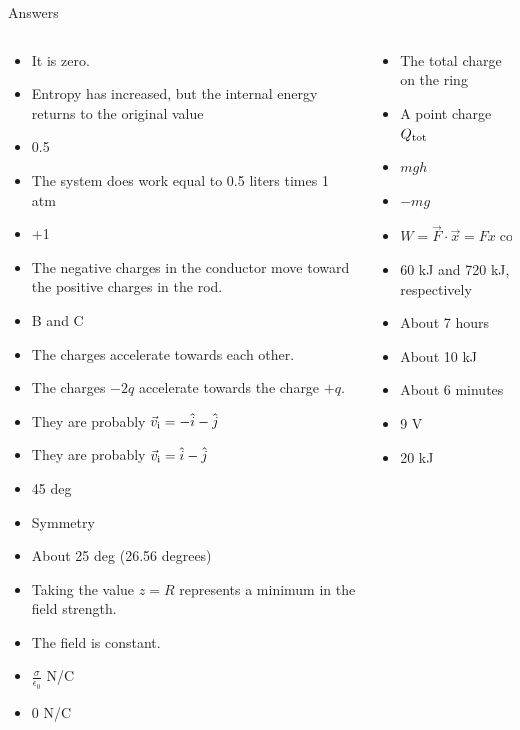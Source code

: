 \documentclass{beamer}
\begin{document}
\begin{frame}{Answers}
\tiny
\begin{columns}[T]
\begin{column}{0.5\textwidth}
\begin{itemize}
\item It is zero.
\item Entropy has increased, but the internal energy returns to the original value
\item 0.5
\item The system does work equal to 0.5 liters times 1 atm
\item +1
\item The negative charges in the conductor move toward the positive charges in the rod.
\item B and C
\item The charges accelerate towards each other.
\item The charges $-2q$ accelerate towards the charge $+q$.
\item They are probably $\vec{v}_{\rm i} = -\hat{i}-\hat{j}$
\item They are probably $\vec{v}_{\rm i} = \hat{i}-\hat{j}$
\item 45 deg
\item Symmetry
\item About 25 deg (26.56 degrees)
\item Taking the value $z = R$ represents a minimum in the field strength.
\item The field is constant.
\item $\frac{\sigma}{\epsilon_0}$ N/C
\item 0 N/C
\end{itemize}
\end{column}
\begin{column}{0.5\textwidth}
\begin{itemize}
\item The total charge on the ring
\item A point charge $Q_{\rm tot}$
\item $mgh$
\item $-mg$
\item $W = \vec{F} \cdot \vec{x} = Fx\cos\theta$
\item 60 kJ and 720 kJ, respectively
\item About 7 hours
\item About 10 kJ
\item About 6 minutes
\item 9 V
\item 20 kJ

\end{itemize}
\end{column}
\end{columns}
\end{frame}
\end{document}
